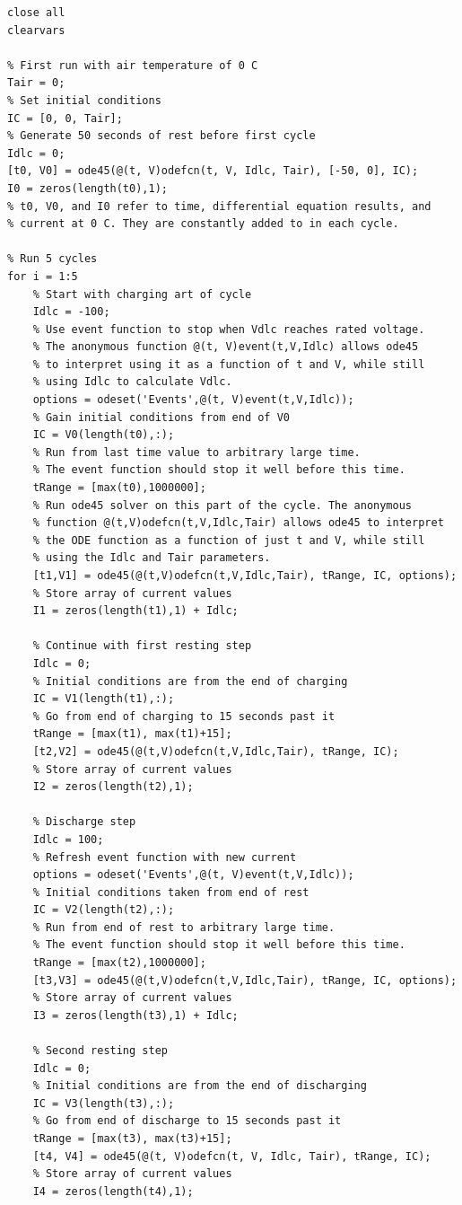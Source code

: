 \documentclass[fleqn]{article}
\begin{document}
\begin{lstlisting}[style=Matlab-editor]
% Eliminate all extraneous variables and plots
close all
clearvars

% First run with air temperature of 0 C
Tair = 0;
% Set initial conditions
IC = [0, 0, Tair];
% Generate 50 seconds of rest before first cycle
Idlc = 0;
[t0, V0] = ode45(@(t, V)odefcn(t, V, Idlc, Tair), [-50, 0], IC);
I0 = zeros(length(t0),1);
% t0, V0, and I0 refer to time, differential equation results, and 
% current at 0 C. They are constantly added to in each cycle.

% Run 5 cycles
for i = 1:5
    % Start with charging art of cycle
    Idlc = -100;
    % Use event function to stop when Vdlc reaches rated voltage.
    % The anonymous function @(t, V)event(t,V,Idlc) allows ode45
    % to interpret using it as a function of t and V, while still
    % using Idlc to calculate Vdlc.
    options = odeset('Events',@(t, V)event(t,V,Idlc));
    % Gain initial conditions from end of V0
    IC = V0(length(t0),:);
    % Run from last time value to arbitrary large time.
    % The event function should stop it well before this time.
    tRange = [max(t0),1000000];
    % Run ode45 solver on this part of the cycle. The anonymous
    % function @(t,V)odefcn(t,V,Idlc,Tair) allows ode45 to interpret
    % the ODE function as a function of just t and V, while still
    % using the Idlc and Tair parameters.
    [t1,V1] = ode45(@(t,V)odefcn(t,V,Idlc,Tair), tRange, IC, options);
    % Store array of current values
    I1 = zeros(length(t1),1) + Idlc;
    
    % Continue with first resting step
    Idlc = 0;
    % Initial conditions are from the end of charging
    IC = V1(length(t1),:);
    % Go from end of charging to 15 seconds past it
    tRange = [max(t1), max(t1)+15];
    [t2,V2] = ode45(@(t,V)odefcn(t,V,Idlc,Tair), tRange, IC);
    % Store array of current values
    I2 = zeros(length(t2),1);
    
    % Discharge step
    Idlc = 100;
    % Refresh event function with new current
    options = odeset('Events',@(t, V)event(t,V,Idlc));
    % Initial conditions taken from end of rest
    IC = V2(length(t2),:);
    % Run from end of rest to arbitrary large time.
    % The event function should stop it well before this time.
    tRange = [max(t2),1000000];
    [t3,V3] = ode45(@(t,V)odefcn(t,V,Idlc,Tair), tRange, IC, options);
    % Store array of current values
    I3 = zeros(length(t3),1) + Idlc;
    
    % Second resting step
    Idlc = 0;
    % Initial conditions are from the end of discharging
    IC = V3(length(t3),:);
    % Go from end of discharge to 15 seconds past it
    tRange = [max(t3), max(t3)+15];
    [t4, V4] = ode45(@(t, V)odefcn(t, V, Idlc, Tair), tRange, IC);
    % Store array of current values
    I4 = zeros(length(t4),1);
    

\end{lstlisting}
\end{document}
